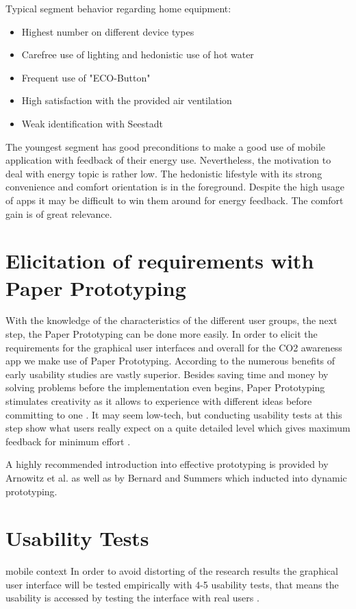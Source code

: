 Typical segment behavior regarding home equipment:
\begin{itemize}
	\item Highest number on different device types
	\item Carefree use of lighting and hedonistic use of hot water
	\item Frequent use of "ECO-Button"
	\item High satisfaction with the provided air ventilation
	\item Weak identification with Seestadt
\end{itemize}

The youngest segment has good preconditions to make a good use of mobile application with feedback of their energy use. Nevertheless, the motivation to deal with energy topic is rather low. The hedonistic lifestyle with its strong convenience and comfort orientation is in the foreground. Despite the high usage of apps it may be difficult to win them around for energy feedback. The comfort gain is of great relevance.

\section{Elicitation of requirements with Paper Prototyping}
\label{section:paperprototyping}
With the knowledge of the characteristics of the different user groups, the next step, the Paper Prototyping can be done more easily. In order to elicit the requirements for the graphical user interfaces and overall for the CO2 awareness app we make use of Paper Prototyping. According to \cite{lancaster2004paper} the numerous benefits of early usability studies are vastly superior. Besides saving time and money by solving problems before the implementation even begins, Paper Prototyping stimulates creativity as it allows to experience with different ideas before committing to one \cite{snyder2003paper}. It may seem low-tech, but conducting usability tests at this step show what users really expect on a quite detailed level which gives maximum feedback for minimum effort \cite{weiss2003handheld}. 

A highly recommended introduction into effective prototyping is provided by Arnowitz et al. \cite{arnowitz2010effective} as well as by Bernard and Summers \cite{bernard2010dynamic} which inducted into dynamic prototyping. 


\section{Usability Tests} mobile context
In order to avoid distorting of the research results the graphical user interface will be tested empirically with 4-5 usability tests, that means the usability is accessed by testing the interface with real users \cite{nielsen1994usability}.

